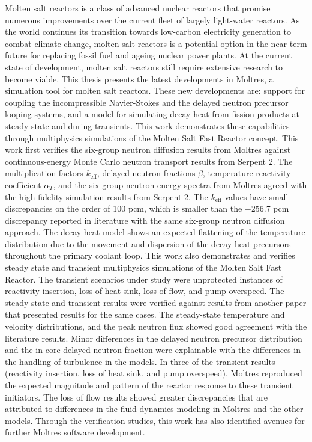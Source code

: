 Molten salt reactors is a class of advanced nuclear reactors that promise
numerous improvements over the current fleet of largely light-water reactors.
As the world continues its transition towards low-carbon electricity
generation to combat climate change, molten salt reactors is a potential
option in the near-term future for replacing fossil fuel and ageing nuclear
power plants. At the current state of development, molten salt reactors still
require extensive research to become viable. This thesis presents the latest
developments in Moltres, a simulation tool for molten salt reactors. These
new developments are: support for coupling the incompressible Navier-Stokes
and the delayed neutron precursor looping systems, and a model for
simulating decay heat from fission products at steady state and during
transients. This work demonstrates these capabilities through multiphysics
simulations of the Molten Salt Fast
Reactor concept. This work first verifies the six-group neutron diffusion
results from Moltres against continuous-energy Monte Carlo neutron transport
results from Serpent 2. The multiplication factors $k_{\text{eff}}$, delayed
neutron fractions $\beta$, temperature reactivity coefficient $\alpha_T$, and
the six-group neutron energy spectra from Moltres agreed with the high
fidelity simulation results from Serpent 2. The $k_{\text{eff}}$ values have
small discrepancies on the order of 100 pcm, which is smaller than the
$-256.7$ pcm discrepancy reported in literature with the same six-group
neutron diffusion approach. The decay heat model shows an expected flattening
of the temperature distribution due to the movement and dispersion of the
decay heat precursors throughout the primary coolant loop. This work also
demonstrates and verifies steady state and
transient multiphysics simulations of the Molten Salt Fast Reactor. The
transient scenarios under study were unprotected instances of reactivity
insertion, loss of heat sink, loss of flow, and pump overspeed. The steady
state and transient results were verified against results from another paper
that presented results for the same cases. The steady-state temperature and
velocity distributions, and the peak neutron flux showed good agreement with
the literature results. Minor differences in the delayed neutron precursor
distribution and the in-core delayed neutron fraction were explainable with
the differences in the handling of turbulence in the models. In three of the
transient results (reactivity insertion, loss of heat sink, and pump
overspeed), Moltres reproduced the expected magnitude and pattern of the
reactor response to these transient initiators.
The loss of flow results showed greater discrepancies that are attributed
to differences in the fluid dynamics modeling in Moltres and the other models.
Through the verification studies, this work has also identified avenues
for further Moltres software development.